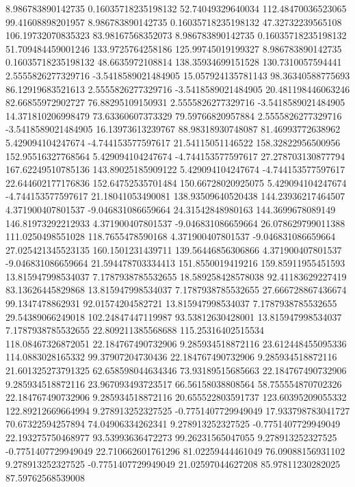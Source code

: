 8.986783890142735 0.16035718235198132 52.74049329640034 112.48470036523065 99.41608898201957
8.986783890142735 0.16035718235198132 47.32732239565108 106.19732070835323 83.98167568352073
8.986783890142735 0.16035718235198132 51.709484459001246 133.9725764258186 125.99745019199327
8.986783890142735 0.16035718235198132 48.6635972108814 138.35934699151528 130.7310057594441
2.5555826277329716 -3.5418589021484905 15.057924135781143 98.36340588775693 86.12919683521613
2.5555826277329716 -3.5418589021484905 20.481198446063246 82.66855972902727 76.88295109150931
2.5555826277329716 -3.5418589021484905 14.371810206998479 73.63360607373329 79.59766820957884
2.5555826277329716 -3.5418589021484905 16.13973613239767 88.98318930748087 81.46993772638962
5.429094104247674 -4.744153577597617 21.54115051146522 158.32822956500956 152.95516327768564
5.429094104247674 -4.744153577597617 27.278703130877794 167.62249510785136 143.89025185909122
5.429094104247674 -4.744153577597617 22.644602177176836 152.64752535701484 150.66728020925075
5.429094104247674 -4.744153577597617 21.18041053490081 138.93509640520438 144.23936217464507
4.371900407801537 -9.046831086659664 24.31542848980163 144.3699678089149 146.81973292212933
4.371900407801537 -9.046831086659664 26.078629799011388 111.0250498551028 118.7655478590168
4.371900407801537 -9.046831086659664 27.025421345523135 160.1501231439711 139.56446856306866
4.371900407801537 -9.046831086659664 21.594478703334413 151.8550019419216 159.85911955451593
13.815947998534037 7.1787938785532655 18.589258428578038 92.41183629227419 83.13626445829868
13.815947998534037 7.1787938785532655 27.666728867436674 99.1347478862931 92.01574204582721
13.815947998534037 7.1787938785532655 29.54389066249018 102.24847447119987 93.53812630428001
13.815947998534037 7.1787938785532655 22.809211385568688 115.25316402515534 118.08467326872051
22.184767490732906 9.285934518872116 23.612448455095336 114.0883028165332 99.37907204730436
22.184767490732906 9.285934518872116 21.601325273791325 62.658598044634346 73.93189515685663
22.184767490732906 9.285934518872116 23.967093493723517 66.56158038808564 58.755554870702326
22.184767490732906 9.285934518872116 20.655522803591737 123.60395209055332 122.89212669664994
9.278913252327525 -0.7751407729949049 17.933798783041727 70.67322594257894 74.04906334262341
9.278913252327525 -0.7751407729949049 22.193275750468977 93.53993636472273 99.26231565047055
9.278913252327525 -0.7751407729949049 22.710662601761296 81.02259444461049 76.09088156931102
9.278913252327525 -0.7751407729949049 21.02597044627208 85.97811230282025 87.59762568539008